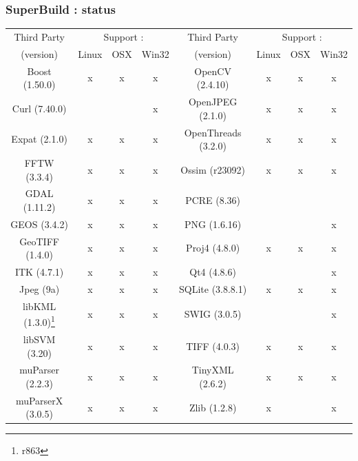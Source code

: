 \documentclass[8pt]{beamer}
\begin{document}
\begin{frame}
\frametitle{SuperBuild : status}

\begin{center}
\begin{tabular}{|c|@{}c@{}|@{}c@{}|@{}c@{}||c|@{}c@{}|@{}c@{}|@{}c@{}|}
\hline
Third Party  & \multicolumn{3}{c||}{Support :} & Third Party  & \multicolumn{3}{c|}{Support :}\\
(version) & Linux & OSX & Win32 & (version) & Linux & OSX & Win32 \\
\hline
Boost (1.50.0) & x & x & x & OpenCV (2.4.10) & x & x & x\\
\hline
Curl (7.40.0) & & & x & OpenJPEG (2.1.0) & x & x & x\\
\hline
Expat (2.1.0) & x & x & x & OpenThreads (3.2.0) & x & x & x\\
\hline
FFTW (3.3.4) & x & x & x & Ossim (r23092) & x & x & x\\
\hline
GDAL (1.11.2) & x & x & x & PCRE (8.36) & & &\\
\hline
GEOS (3.4.2) & x & x & x & PNG (1.6.16) &  &  & x\\
\hline
GeoTIFF (1.4.0) & x & x & x & Proj4 (4.8.0) & x & x & x\\
\hline
ITK (4.7.1) & x & x & x & Qt4 (4.8.6) & & & x\\
\hline
Jpeg (9a) & x & x & x & SQLite (3.8.8.1) & x & x & x\\
\hline
libKML (1.3.0)\footnote{r863} & x & x & x & SWIG (3.0.5) & & & x\\
\hline
libSVM (3.20) & x & x & x & TIFF (4.0.3) & x & x & x\\
\hline
muParser (2.2.3) & x & x & x & TinyXML (2.6.2) & x & x & x\\
\hline
muParserX (3.0.5) & x & x & x & Zlib (1.2.8) & x & & x\\
\hline

\end{tabular}
\end{center}


\end{frame}
\end{document}

